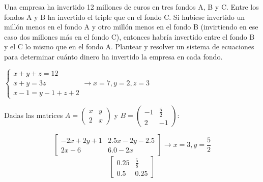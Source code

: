 \documentclass[addpoints,spanish, 12pt,a4paper]{exam}
\begin{document}
\begin{questions}

\question[4] Una empresa ha invertido 12 millones de euros en tres fondos
A, B y C. Entre los fondos A y B ha invertido el triple que en el fondo C. Si
hubiese invertido un millón menos en el fondo A y otro millón menos en el
fondo B (invirtiendo en ese caso dos millones más en el fondo C), entonces
habría invertido entre el fondo B y el C lo mismo que en el fondo A. Plantear y
resolver un sistema de ecuaciones para determinar cuánto dinero ha invertido
la empresa en cada fondo.
\begin{solution}
    $\left\{
    \begin{matrix}
        x+y+z=12 \\
        x+y=3z \\
        x-1=y-1+z+2
    \end{matrix}
    \right. \to x=7, y=2, z=3$
\end{solution}

\question[4] Dadas las matrices $A=\left(\begin{matrix}x & y\\2 & x\end{matrix}\right)$ y 
$B=\left(\begin{matrix}-1 & \frac{5}{2}\\2 & -1\end{matrix}\right)
$:
\begin{solution}
    $$\left[\begin{matrix}- 2 x + 2 y + 1 & 2.5 x - 2 y - 2.5\\2 x - 6 & 6.0 - 2 x\end{matrix}\right]\to x=3, y=\frac{5}{2}
$$
$$\left[\begin{matrix}0.25 & \frac{5}{8}\\0.5 & 0.25\end{matrix}\right]
$$
\end{solution}


\end{questions}
\end{document}
